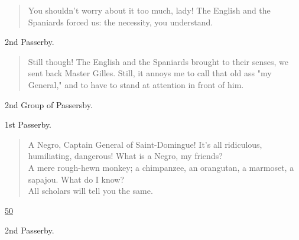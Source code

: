 \documentclass[letterpaper,article,12pt,oneside,notitlepage]{memoir}
\begin{document}
\begin{verse}
\indent You shouldn't worry about it too much, lady! The English and the Spaniards forced us: the necessity, you understand. \\
\end{verse}

\begin{center}2nd Passerby.\end{center}

\begin{verse}
\indent Still though! The English and the Spaniards brought to their senses, we sent back Master Gilles. Still, it annoys me to call that old ass "my General," and to have to stand at attention in front of him. \\
\end{verse}

\begin{center}2nd Group of Passersby.\end{center}

\begin{center}1st Passerby.\end{center}

\begin{verse}
\indent A Negro, Captain General of Saint-Domingue! It's all ridiculous, humiliating, dangerous! What is a Negro, my friends? \\
\indent A mere rough-hewn monkey; a chimpanzee, an orangutan, a marmoset, a sapajou. What do I know? \\
\hspace{1cm} All scholars will tell you the same. \\
\end{verse}

\clearpage

\href{http://cesaire.elotroalex.com/chiens/chiens/p050.html}{50}

\begin{center}2nd Passerby.\end{center}
\end{document}
